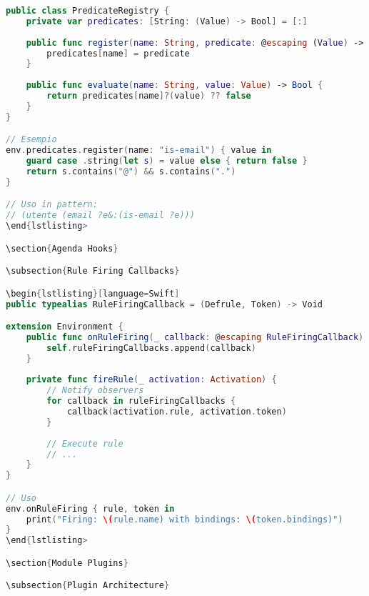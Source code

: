\begin{lstlisting}[language=Swift]
public class PredicateRegistry {
    private var predicates: [String: (Value) -> Bool] = [:]
    
    public func register(name: String, predicate: @escaping (Value) -> Bool) {
        predicates[name] = predicate
    }
    
    public func evaluate(name: String, value: Value) -> Bool {
        return predicates[name]?(value) ?? false
    }
}

// Esempio
env.predicates.register(name: "is-email") { value in
    guard case .string(let s) = value else { return false }
    return s.contains("@") && s.contains(".")
}

// Uso in pattern:
// (utente (email ?e&:(is-email ?e)))
\end{lstlisting>

\section{Agenda Hooks}

\subsection{Rule Firing Callbacks}

\begin{lstlisting}[language=Swift]
public typealias RuleFiringCallback = (Defrule, Token) -> Void

extension Environment {
    public func onRuleFiring(_ callback: @escaping RuleFiringCallback) {
        self.ruleFiringCallbacks.append(callback)
    }
    
    private func fireRule(_ activation: Activation) {
        // Notify observers
        for callback in ruleFiringCallbacks {
            callback(activation.rule, activation.token)
        }
        
        // Execute rule
        // ...
    }
}

// Uso
env.onRuleFiring { rule, token in
    print("Firing: \(rule.name) with bindings: \(token.bindings)")
}
\end{lstlisting>

\section{Module Plugins}

\subsection{Plugin Architecture}


\end{lstlisting}

